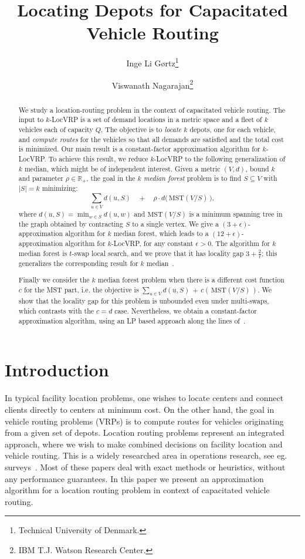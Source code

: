 \documentclass[11pt,twoside,a4paper]{article}
\title{Locating Depots for Capacitated Vehicle Routing}
\author{
Inge Li G{\o}rtz\thanks{Technical University of Denmark.} \and Viswanath Nagarajan\thanks{IBM T.J. Watson Research
Center. } }
\date{}
\newcommand{\sse}{\subseteq}
\def\lrp{$k$-LocVRP\xspace}
\begin{document}
\maketitle
\begin{abstract}
We study a location-routing problem in the context of capacitated vehicle routing. The input to \lrp is a set of demand
locations in a metric space and a fleet of $k$ vehicles each of capacity $Q$. The objective is to {\em locate} $k$
depots, one for each vehicle, and {\em compute routes} for the vehicles so that all demands are satisfied and the total
cost is minimized. Our main result is a constant-factor approximation algorithm for \lrp. To achieve this result, we
reduce \lrp to the following generalization of $k$ median, which might be of independent interest. Given a metric
$(V,d)$, bound $k$ and parameter $\rho\in\mathbb{R}_+$, the goal in the {\em $k$ median forest} problem is to find
$S\sse V$ with $|S|=k$ minimizing:
$$\sum_{u\in V} d(u,S) \quad + \quad \rho\cdot d\big(\,\mbox{MST}(V/S)\,\big),$$
where $d(u,S)=\min_{w\in S} d(u,w)$ and $\mbox{MST}(V/S)$ is a minimum spanning tree in the graph obtained by
contracting $S$ to a single vertex. We give a $(3+\epsilon)$-approximation algorithm for $k$ median forest, which leads
to a $(12+\epsilon)$-approximation algorithm for \lrp, for any constant $\epsilon>0$. The algorithm for  $k$ median
forest is $t$-swap local search, and we prove that it has locality gap $3+\frac2t$; this generalizes the corresponding
result for $k$ median~\cite{AGKMMP04}.

Finally we consider  the $k$ median forest problem when there is a different cost function $c$ for the MST part, i.e.
the objective is $\sum_{u\in V} d(u,S) \,+ \,c (\,\mbox{MST}(V/S)\,)$. We show that the locality gap for this problem
is unbounded even under multi-swaps, which contrasts with the $c=d$ case. Nevertheless,  we obtain a constant-factor
approximation algorithm, using an LP based approach along the lines of~\cite{KKNSS11}.

\end{abstract}

\section{Introduction}\label{sec:intro}
In typical facility location problems, one wishes to locate centers and connect clients directly to centers at minimum
cost. On the other hand, the goal in vehicle routing problems (VRPs) is to compute routes for vehicles originating from
a given set of depots. Location routing problems represent an integrated approach, where we wish to  make combined
decisions on facility location and vehicle routing. This is a widely researched area in operations research, see eg.
surveys~\cite{BWW87,L88,L89,BJS95,MJS98,NS07}. Most of these papers deal with exact methods or heuristics, without any
performance guarantees. In this paper we present an approximation algorithm for a location routing problem in context
of capacitated vehicle routing.
\end{document}
